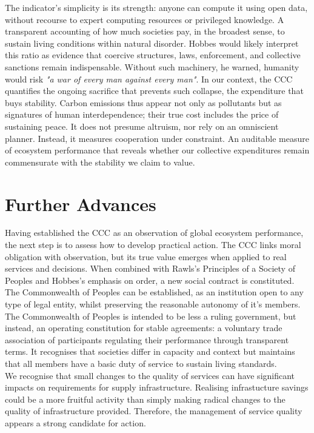 \documentclass[10pt, oneside]{article}   	%
\begin{document}
The indicator’s simplicity is its strength: anyone can compute it using open data, without recourse to expert computing resources or privileged knowledge.
A transparent accounting of how much societies pay, in the broadest sense, to sustain living conditions within natural disorder.
Hobbes would likely interpret this ratio as evidence that coercive structures, laws, enforcement, and collective sanctions remain indispensable.
Without such machinery, he warned, humanity would risk \emph{"a war of every man against every man"}.
In our context, the CCC quantifies the ongoing sacrifice that prevents such collapse, the expenditure that buys stability.
Carbon emissions thus appear not only as pollutants but as signatures of human interdependence; their true cost includes the price of sustaining peace.
It does not presume altruism, nor rely on an omniscient planner.
Instead, it measures cooperation under constraint.
An auditable measure of ecosystem performance that reveals whether our collective expenditures remain commensurate with the stability we claim to value.\\

\section{Further Advances}

Having established the CCC as an observation of global ecosystem performance, the next step is to assess how to develop practical action.
The CCC links moral obligation with observation, but its true value emerges when applied to real services and decisions.
When combined with Rawls’s Principles of a Society of Peoples and Hobbes’s emphasis on order, a new social contract is constituted.
The Commonwealth of Peoples can be established, as an institution open to any type of legal entity, whilst preserving the reasonable autonomy of it's members.\\

The Commonwealth of Peoples is intended to be less a ruling government, but instead, an operating constitution for stable agreements: a voluntary trade association of participants regulating their performance through transparent terms.
It recognises that societies differ in capacity and context but maintains that all members have a basic duty of service to sustain living standards.\\

We recognise that small changes to the quality of services can have significant impacts on requirements for supply infrastructure.
Realising infrastucture savings could be a more fruitful activity than simply making radical changes to the quality of infrastructure provided.
Therefore, the management of service quality appears a strong candidate for action.\\
\end{document}

